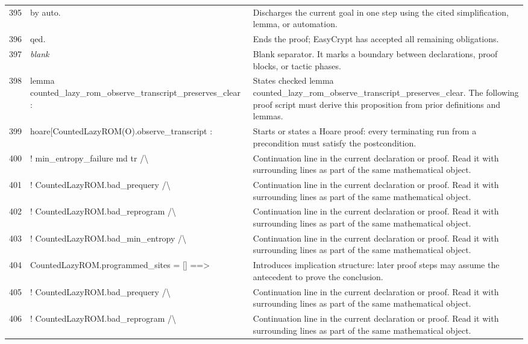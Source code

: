 \documentclass[10pt]{article}
\begin{document}
\begin{longtable}{r L{0.53\textwidth} L{0.37\textwidth}}
395 & {\ttfamily\scriptsize by auto.} & Discharges the current goal in one step using the cited simplification, lemma, or automation. \\
396 & {\ttfamily\scriptsize qed.} & Ends the proof; EasyCrypt has accepted all remaining obligations. \\
397 & {\ttfamily\scriptsize \emph{blank}} & Blank separator.  It marks a boundary between declarations, proof blocks, or tactic phases. \\
398 & {\ttfamily\scriptsize lemma counted\_lazy\_rom\_observe\_transcript\_preserves\_clear :} & States checked lemma counted\_lazy\_rom\_observe\_transcript\_preserves\_clear.  The following proof script must derive this proposition from prior definitions and lemmas. \\
399 & {\ttfamily\scriptsize   hoare[CountedLazyROM(O).observe\_transcript :} & Starts or states a Hoare proof: every terminating run from a precondition must satisfy the postcondition. \\
400 & {\ttfamily\scriptsize     ! min\_entropy\_failure md tr /\textbackslash{}} & Continuation line in the current declaration or proof.  Read it with surrounding lines as part of the same mathematical object. \\
401 & {\ttfamily\scriptsize     ! CountedLazyROM.bad\_prequery /\textbackslash{}} & Continuation line in the current declaration or proof.  Read it with surrounding lines as part of the same mathematical object. \\
402 & {\ttfamily\scriptsize     ! CountedLazyROM.bad\_reprogram /\textbackslash{}} & Continuation line in the current declaration or proof.  Read it with surrounding lines as part of the same mathematical object. \\
403 & {\ttfamily\scriptsize     ! CountedLazyROM.bad\_min\_entropy /\textbackslash{}} & Continuation line in the current declaration or proof.  Read it with surrounding lines as part of the same mathematical object. \\
404 & {\ttfamily\scriptsize     CountedLazyROM.programmed\_sites = [] ==>} & Introduces implication structure: later proof steps may assume the antecedent to prove the conclusion. \\
405 & {\ttfamily\scriptsize     ! CountedLazyROM.bad\_prequery /\textbackslash{}} & Continuation line in the current declaration or proof.  Read it with surrounding lines as part of the same mathematical object. \\
406 & {\ttfamily\scriptsize     ! CountedLazyROM.bad\_reprogram /\textbackslash{}} & Continuation line in the current declaration or proof.  Read it with surrounding lines as part of the same mathematical object. \\

\end{longtable}
\end{document}
